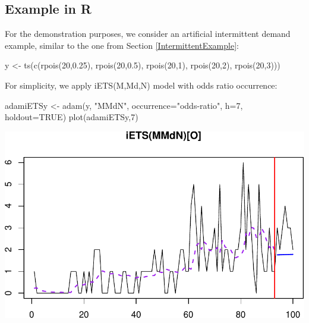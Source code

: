 \documentclass[
]{book}
\newenvironment{Shaded}{\begin{snugshade}}{\end{snugshade}}
\newcommand{\AttributeTok}[1]{\textcolor[rgb]{0.77,0.63,0.00}{#1}}
\newcommand{\ConstantTok}[1]{\textcolor[rgb]{0.00,0.00,0.00}{#1}}
\newcommand{\DecValTok}[1]{\textcolor[rgb]{0.00,0.00,0.81}{#1}}
\newcommand{\FloatTok}[1]{\textcolor[rgb]{0.00,0.00,0.81}{#1}}
\newcommand{\FunctionTok}[1]{\textcolor[rgb]{0.00,0.00,0.00}{#1}}
\newcommand{\NormalTok}[1]{#1}
\newcommand{\OtherTok}[1]{\textcolor[rgb]{0.56,0.35,0.01}{#1}}
\newcommand{\StringTok}[1]{\textcolor[rgb]{0.31,0.60,0.02}{#1}}
\theoremstyle{definition}
\theoremstyle{definition}
\theoremstyle{definition}
\theoremstyle{definition}
\theoremstyle{remark}
\begin{document}
\hypertarget{forecastingADAMOtherExample}{%
\subsection{Example in R}\label{forecastingADAMOtherExample}}

For the demonstration purposes, we consider an artificial intermittent demand example, similar to the one from Section \ref{IntermittentExample}:

\begin{Shaded}
\begin{Highlighting}[]
\NormalTok{y }\OtherTok{\textless{}{-}} \FunctionTok{ts}\NormalTok{(}\FunctionTok{c}\NormalTok{(}\FunctionTok{rpois}\NormalTok{(}\DecValTok{20}\NormalTok{,}\FloatTok{0.25}\NormalTok{), }\FunctionTok{rpois}\NormalTok{(}\DecValTok{20}\NormalTok{,}\FloatTok{0.5}\NormalTok{), }\FunctionTok{rpois}\NormalTok{(}\DecValTok{20}\NormalTok{,}\DecValTok{1}\NormalTok{),}
          \FunctionTok{rpois}\NormalTok{(}\DecValTok{20}\NormalTok{,}\DecValTok{2}\NormalTok{), }\FunctionTok{rpois}\NormalTok{(}\DecValTok{20}\NormalTok{,}\DecValTok{3}\NormalTok{)))}
\end{Highlighting}
\end{Shaded}

For simplicity, we apply iETS(M,Md,N) model with odds ratio occurrence:

\begin{Shaded}
\begin{Highlighting}[]
\NormalTok{adamiETSy }\OtherTok{\textless{}{-}} \FunctionTok{adam}\NormalTok{(y, }\StringTok{"MMdN"}\NormalTok{, }\AttributeTok{occurrence=}\StringTok{"odds{-}ratio"}\NormalTok{,}
                  \AttributeTok{h=}\DecValTok{7}\NormalTok{, }\AttributeTok{holdout=}\ConstantTok{TRUE}\NormalTok{)}
\FunctionTok{plot}\NormalTok{(adamiETSy,}\DecValTok{7}\NormalTok{)}
\end{Highlighting}
\end{Shaded}

\includegraphics{Svetunkov--2022----ADAM_files/figure-latex/unnamed-chunk-155-1.pdf}
\end{document}
